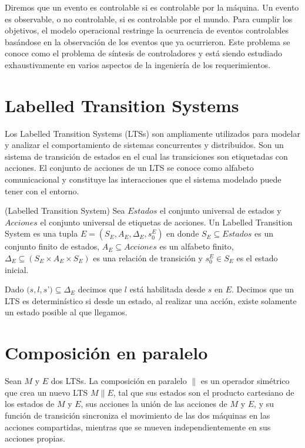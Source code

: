 \vspace{\baselineskip}
Diremos que un evento es controlable si es controlable por la máquina. Un evento es observable, o no controlable, si es 
controlable por el mundo. 
Para cumplir los objetivos, el modelo operacional restringe la ocurrencia de eventos controlables basándose en la observación 
de los eventos que ya ocurrieron. 
Este problema se conoce como el problema de síntesis de controladores y está siendo estudiado exhaustivamente en varios 
aspectos de la ingeniería de los requerimientos.

\section{Labelled Transition Systems}
Los Labelled Transition Systems \cite{LTS} (LTSs) son ampliamente utilizados para modelar y analizar el comportamiento de 
sistemas concurrentes y distribuidos. Son un sistema de transición de estados en el cual las transiciones son etiquetadas 
con acciones. El conjunto de acciones de un LTS se conoce como alfabeto comunicacional y constituye las interacciones que 
el sistema modelado puede tener con el entorno.

\begin{definition}{(Labelled Transition System)}
Sea $Estados$ el conjunto universal de estados y $Acciones$ el conjunto universal de etiquetas de acciones. Un Labelled 
Transition System es una tupla $E = (S_{E}, A_{E}, \Delta_{E}, s_{0}^{E})$ en donde $S_{E} \subseteq Estados$ es un conjunto 
finito de estados, $A_{E} \subseteq Acciones$ es un alfabeto finito, $\Delta_{E} \subseteq (S_{E} \times A_{E} \times S_{E})$ es una 
relación de transición y $s_{0}^{E} \in S_{E}$ es el estado inicial.
\end{definition}

Dado $(s, l, s$’$) \subseteq \Delta_{E}$ decimos que $l$ está habilitada desde $s$ en $E$. Decimos que un LTS es 
determinístico si desde un estado, al realizar una acción, existe solamente un estado posible al que llegamos.

\section{Composición en paralelo}

Sean $M$ y $E$ dos LTSs. La composición en paralelo $\parallel$ es un operador simétrico que crea un nuevo LTS $M \parallel E$, 
tal que sus estados son el producto cartesiano de los estados de $M$ y $E$, sus acciones la unión de las acciones de $M$ y $E$, 
y su función de transición sincroniza el movimiento de las dos máquinas en las acciones compartidas, mientras que se 
mueven independientemente en sus acciones propias.

